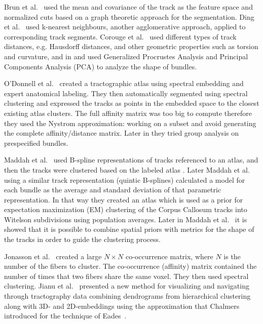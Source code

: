 \documentclass{bioinfo}
\begin{document}
Brun et al.~\cite{brun2004clustering} used the mean and covariance
of the track as the feature space and normalized cuts based on a graph
theoretic approach for the segmentation. Ding et al.~\cite{Ding2003a}
used k-nearest neighbours, another agglomerative approach, applied
to corresponding track segments. Corouge et al.~\cite{corouge2004towards}
used different types of track distances, e.g. Hausdorff distances,
and other geometric properties such as torsion and curvature, and
in \cite{Corouge2004} and \cite{Corouge2006} used Generalized Procrustes
Analysis and Principal Components Analysis (PCA) to analyze the shape
of bundles.

O'Donnell et al.~\cite{ODonnell_IEEETMI07} created a tractographic
atlas using spectral embedding and expert anatomical labeling. They
then automatically segmented using spectral clustering and expressed
the tracks as points in the embedded space to the closest existing
atlas clusters. The full affinity matrix was too big to compute therefore
they used the Nystrom approximation: working on a subset and avoid
generating the complete affinity/distance matrix. Later in \cite{o2009tract}
they tried group analysis on prespecified bundles.

Maddah et al.~\cite{Maddah_MICCA2005} used B-spline representations
of tracks referenced to an atlas, and then the tracks were clustered
based on the labeled atlas . Later Maddah et al.~\cite{maddah2006statistical}
using a similar track representation (quintic B-splines) calculated
a model for each bundle as the average and standard deviation of that
parametric representation. In that way they created an atlas which
is used as a prior for expectation maximization (EM) clustering of
the Corpus Callosum tracks into Witelson subdivisions \cite{witelson1989hand}
using population averages. Later in \cite{Maddah_IEEEBI2008} Maddah
et al.~ it is showed that it is possible to combine spatial priors
with metrics for the shape of the tracks in order to guide the clustering
process.

Jonasson et al.~\cite{jonasson2005fiber} created a large $N\times N$
co-occurrence matrix, where $N$ is the number of the fibers to cluster.
The co-occurrence (affinity) matrix contained the number of times
that two fibers share the same voxel. They then used spectral clustering.
Jianu et al.~\cite{jianu2009exploring} presented a new method for
visualizing and navigating through tractography data combining dendrograms
from hierarchical clustering along with 3D- and 2D-embeddings using
the approximation that Chalmers~\cite{chalmers1996linear} introduced
for the technique of Eades~\cite{eades1984heuristic}.
\end{document}

